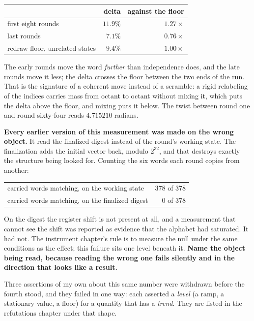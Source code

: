 \begin{center}
\begin{tabular}{lrr}
\toprule
 & delta & against the floor \\
\midrule
first eight rounds & \(11.9\%\) & \(1.27\times\) \\
last rounds & \(7.1\%\) & \(0.76\times\) \\
redraw floor, unrelated states & \(9.4\%\) & \(1.00\times\) \\
\bottomrule
\end{tabular}
\end{center}

The early rounds move the word \emph{further} than independence does, and the late rounds move it less; the delta crosses the floor between the two ends of the run. That is the signature of a coherent move instead of a scramble: a rigid relabeling of the indices carries mass from octant to octant without mixing it, which puts the delta above the floor, and mixing puts it below. The twist between round one and round sixty-four reads \(4.715210\) radians.

\textbf{Every earlier version of this measurement was made on the wrong object.} It read the finalized digest instead of the round's working state. The finalization adds the initial vector back, modulo \(2^{32}\), and that destroys exactly the structure being looked for. Counting the six words each round copies from another:

\begin{center}
\begin{tabular}{lr}
\toprule
carried words matching, on the working state & \(378\) of \(378\) \\
carried words matching, on the finalized digest & \(0\) of \(378\) \\
\bottomrule
\end{tabular}
\end{center}

On the digest the register shift is not present at all, and a measurement that cannot see the shift was reported as evidence that the alphabet had saturated. It had not. The instrument chapter's rule is to measure the null under the same conditions as the effect; this failure sits one level beneath it. \textbf{Name the object being read, because reading the wrong one fails silently and in the direction that looks like a result.}

Three assertions of my own about this same number were withdrawn before the fourth stood, and they failed in one way: each asserted a \emph{level} (a ramp, a stationary value, a floor) for a quantity that has a \emph{trend}. They are listed in the refutations chapter under that shape.

